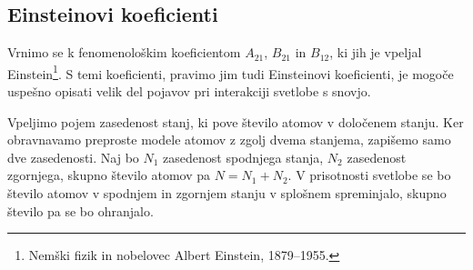 \subsection*{Einsteinovi koeficienti}
\label{AB}
Vrnimo se k fenomenološkim koeficientom $A_{21}$, $B_{21}$ in $B_{12}$, ki jih je 
vpeljal Einstein\footnote{Nemški fizik in nobelovec Albert Einstein, 1879--1955.}. 
S temi koeficienti, pravimo jim tudi Einsteinovi koeficienti, 
je mogoče uspešno opisati velik del pojavov pri interakciji svetlobe s snovjo.


Vpeljimo pojem zasedenost stanj, ki pove število 
atomov v določenem stanju. Ker obravnavamo preproste modele atomov z zgolj 
dvema stanjema, zapišemo samo dve zasedenosti. Naj bo $N_1$ zasedenost 
spodnjega stanja, $N_{2}$ zasedenost zgornjega, skupno število atomov pa
$N=N_1+N_2$. V prisotnosti svetlobe 
se bo število atomov v spodnjem in zgornjem stanju v splošnem spreminjalo, skupno 
število pa se bo ohranjalo.



